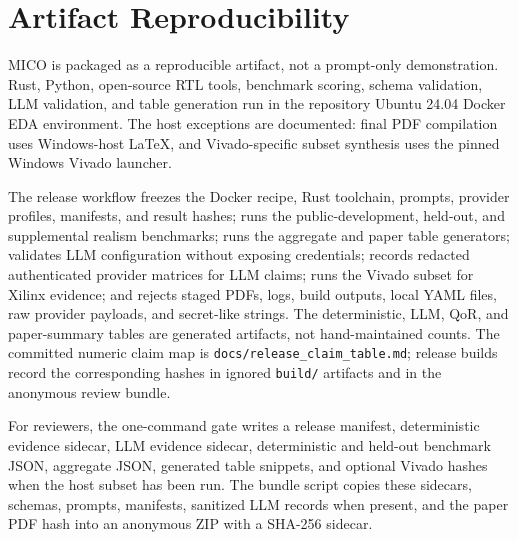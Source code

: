 \section{Artifact Reproducibility}

MICO is packaged as a reproducible artifact, not a prompt-only demonstration.
Rust, Python, open-source RTL tools, benchmark scoring, schema validation, LLM
validation, and table generation run in the repository Ubuntu 24.04 Docker EDA
environment. The host exceptions are documented: final PDF compilation uses
Windows-host \LaTeX{}, and Vivado-specific subset synthesis uses the pinned
Windows Vivado launcher.

The release workflow freezes the Docker recipe, Rust toolchain, prompts,
provider profiles, manifests, and result hashes; runs the public-development,
held-out, and supplemental realism benchmarks; runs the aggregate and paper
table generators; validates LLM configuration without exposing credentials;
records redacted authenticated provider matrices for LLM claims; runs the
Vivado subset for Xilinx evidence; and rejects staged PDFs, logs, build outputs,
local YAML files, raw provider payloads, and secret-like strings. The
deterministic, LLM, QoR, and paper-summary tables are generated artifacts, not
hand-maintained counts. The committed numeric claim map is
\texttt{docs/release\_claim\_table.md}; release builds record the corresponding
hashes in ignored \texttt{build/} artifacts and in the anonymous review bundle.

For reviewers, the one-command gate writes a release manifest, deterministic
evidence sidecar, LLM evidence sidecar, deterministic and held-out benchmark
JSON, aggregate JSON, generated table snippets, and optional Vivado hashes when
the host subset has been run. The bundle script copies these sidecars, schemas,
prompts, manifests, sanitized LLM records when present, and the paper PDF hash
into an anonymous ZIP with a SHA-256 sidecar.

